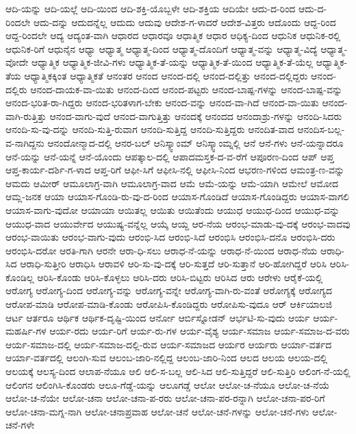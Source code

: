 {ಆದಿ-ಯನ್ನು
ಆದಿ-ಯಲ್ಲೆ
ಆದಿ-ಯಿಂದ
ಆದಿ-ಶಕ್ತಿ-ಯೊಬ್ಬಳೇ
ಆದಿ-ಶಕ್ತಿಯ
ಆದಿಯೇ
ಆದು-ದ-ರಿಂದ
ಆದು-ದ-ರಿಂದಲೇ
ಆದು-ದನ್ನು
ಆದುದನ್ನೆಲ್ಲ
ಆದುದು
ಆದುವು
ಆದೇಶ-ಗ-ಳಾದರೆ
ಆದೇಶ-ವಿತ್ತರು
ಆದೊಂದು
ಆದ್ದ-ರಿಂದ
ಆದ್ದ-ರಿಂದಲೇ
ಆದ್ಯ
ಆದ್ಯಂತ-ವಾಗಿ
ಆಧಾರದ
ಆಧಾರವೂ
ಆಧಾತ್ಮಿಕ
ಆಧಾರ
ಆಧಿಕ್ಯ-ದಿಂದ
ಆಧುನಿಕ
ಆಧುನಿಕ-ರಲ್ಲಿ
ಆಧುನಿಕ-ರಿಗೆ
ಆಧುನೈನ
ಆಧ್ಯಾ
ಆಧ್ಯಾತ್ಮ
ಆಧ್ಯಾತ್ಮ-ದಿಂದ
ಆಧ್ಯಾತ್ಮ-ದೊಂದಿಗೆ
ಆಧ್ಯಾತ್ಮ-ವನ್ನು
ಆಧ್ಯಾತ್ಮ-ವಿದ್ಯೆ
ಆಧ್ಯಾತ್ಮ-ವೋದೇ
ಆಧ್ಯಾತ್ಮಿಕ
ಆಧ್ಯಾತ್ಮಿಕ-ಜೀವಿ-ಗಳು
ಆಧ್ಯಾತ್ಮಿಕ-ತೆ-ಯನ್ನು
ಆಧ್ಯಾತ್ಮಿಕ-ತೆ-ಯಿಂದ
ಆಧ್ಯಾತ್ಮಿಕ-ತೆ-ಯೆಲ್ಲ
ಆಧ್ಯಾತ್ಮಿಕ-ತೆಯ
ಆಧ್ಯಾತ್ಮಿಕಕ್ಕಿಂತ
ಆಧ್ಯಾತ್ಮಿಕತೆ
ಆನಂತರ
ಆನಂದ
ಆನಂದ-ದಲ್ಲಿ
ಆನಂದ-ದಲ್ಲಿತ್ತು
ಆನಂದ-ದಲ್ಲಿದ್ದರು
ಆನಂದ-ದಲ್ಲಿರು
ಆನಂದ-ದಾಯಕ-ವಾ-ಯಿತು
ಆನಂದ-ದಿಂದ
ಆನಂದ-ಪಟ್ಟರು
ಆನಂದ-ಬಾಷ್ಪ-ಗಳನ್ನು
ಆನಂದ-ಬಾಷ್ಪ-ವನ್ನು
ಆನಂದ-ಭರಿತ-ರಾ-ಗಿದ್ದರು
ಆನಂದ-ಭರಿತಳಾಗ-ಬೇಕು
ಆನಂದ-ವನ್ನು
ಆನಂದ-ವಾ-ಗಿದೆ
ಆನಂದ-ವಾ-ಯಿತು
ಆನಂದ-ವಾಗಿ-ರುತ್ತಿತ್ತು
ಆನಂದ-ವಾಗು-ವುದೆ
ಆನಂದ-ವಾಗುತ್ತಿತ್ತು
ಆನಂದಕ್ಕೆ
ಆನಂದದ
ಆನಂದಾಶ್ರು-ಗಳನ್ನು
ಆನಂದಿ-ಸಿದರು
ಆನಂದಿ-ಸು-ವು-ದನ್ನು
ಆನಂದಿ-ಸುತ್ತಿ-ರುವಾಗ
ಆನಂದಿ-ಸುತ್ತಿದ್ದ
ಆನಂದಿ-ಸುತ್ತಿದ್ದರು
ಆನಂದಿತ-ವಾದ
ಆನಂದಿಸ-ಬಲ್ಲ-ವ-ನಾಗಿದ್ದನು
ಆನಂದೋನ್ಮಾದ-ದಲ್ಲಿ
ಆನರ-ಬಲ್
ಆನಿಸ್ಕ್ವಾಂಮ್
ಆನಿಸ್ಕ್ವಾಂಮ್ನಲ್ಲಿ
ಆನೆ
ಆನೆ-ಗಳು
ಆನೆ-ಯನ್ನಾದರೂ
ಆನೆ-ಯನ್ನು
ಆನೆ-ಯನ್ನೆ
ಆನೆ-ಯೊಂದು
ಆಪತ್ಕಾಲ-ದಲ್ಲಿ
ಆಪಾದಮಸ್ತಕ-ದ-ವ-ರೆಗೆ
ಆಪೂರಣ-ದಿಂದ
ಆಪ್
ಆಪ್ತ
ಆಪ್ತ-ಕಾರ್ಯ-ದರ್ಶಿ-ಗ-ಳಾದ
ಆಪ್ತ-ರಿಗೆ
ಆಫೀ-ಸಿಗೆ
ಆಫೀಸಿ-ನಲ್ಲಿ
ಆಫೀಸಿ-ನಿಂದ
ಆಭರಣ-ಗಳಿಂದ
ಆಮಂತ್ರ-ಣ-ವನ್ನು
ಆಮದು
ಆಮೀರ್
ಆಮೂಲಾಗ್ರ-ವಾಗಿ
ಆಮೂಲಾಗ್ರ-ವಾದ
ಆಮೆ
ಆಮೆ-ಯನ್ನು
ಆಮೆ-ಯಾಗಿ
ಆಮೇಲೆ
ಆಮೋದ
ಆಮ್ಲ-ಜನಕ
ಆಯಾ
ಆಯಾಸ-ಗೊಂಡಿ-ರು-ವು-ದ-ರಿಂದ
ಆಯಾಸ-ಗೊಂಡಿದೆ
ಆಯಾಸ-ಗೊಂಡಿದ್ದರು
ಆಯಾಸ-ವಾಗಲಿ
ಆಯಾಸ-ವಾಗು-ವುದೋ
ಆಯಾಯಾ
ಆಯಿತಲ್ಲ
ಆಯಿತು
ಆಯಿತೆಂದು
ಆಯುಧ
ಆಯುಧ-ದಿಂದ
ಆಯುಧ-ವನ್ನು
ಆಯುಧ-ವಾದ
ಆಯುರ್ವೇದ
ಆಯುಷ್ಯ-ವನ್ನೆಲ್ಲ
ಆಯ್ಕೆ
ಆಯ್ದ
ಆರ-ನೆಯ
ಆರಂಭ-ಮಾಡು-ವು-ದಕ್ಕೆ
ಆರಂಭ-ವಾದವು
ಆರಂಭ-ವಾಯಿತು
ಆರಂಭ-ವಾಗು-ವುದು
ಆರಂಭಿ-ಸಿದ
ಆರಂಭಿ-ಸಿದೆ
ಆರಂಭಿಸಿ
ಆರಂಭಿಸಿ-ದನೊ
ಆರಂಭಿಸಿ-ದರು
ಆರಂಭಿಸಿ-ದರೋ
ಆರತಿ-ಗಾಗಿ
ಆರನೇ
ಆರಾ-ಧಿ-ಸಲು
ಆರಾಧ-ನೆ-ಯನ್ನು
ಆರಾಧ-ನೆ-ಯಿಂದ
ಆರಾಧ-ನೆಯ
ಆರಾಧಿ-ಸಿದ
ಆರಾಧಿ-ಸುತ್ತೀರಿ
ಆರಾಧಿಸಿ
ಆರಾವಳಿ
ಆರಿ-ಸು-ವು-ದಕ್ಕೆ
ಆರಿ-ಸುತ್ತದೆ
ಆರಿ-ಸುತ್ತಾನೆ
ಆರಿ-ಹೋಗಿದ್ದರೆ
ಆರಿಸಿ
ಆರಿಸಿ-ಕೊಂಡಿಲ್ಲ
ಆರಿಸಿ-ಕೊಂಡು
ಆರಿಸಿ-ಕೊಳ್ಳಲು
ಆರಿಸಿ-ದರು
ಆರಿಸಿ-ಬಿಟ್ಟರು
ಆರಿಸಿದ
ಆರು
ಆರೇಳು
ಆರೈಕೆ-ಯಲ್ಲಿ
ಆರೋಗ್ಯ
ಆರೋಗ್ಯ-ದಿಂದ
ಆರೋಗ್ಯ-ವನ್ನು
ಆರೋಗ್ಯ-ವನ್ನೇ
ಆರೋಗ್ಯ-ವಾಗಿ-ರು-ವಂತೆ
ಆರೋಗ್ಯಕ್ಕೆ
ಆರೋಗ್ಯದ
ಆರೋಪ-ಮಾಡಿ
ಆರೋಪ-ಮಾಡಿ-ಕೊಂಡು
ಆರೋಪಿಸಿ-ಕೊಂಡಿದ್ದರು
ಆರೋಪಿಸು-ವುದೂ
ಆರ್
ಆರ್ಕಿಯಾಲಜಿ
ಆರ್ಟ
ಆರ್ತರೂ
ಆರ್ಥಿಕ
ಆರ್ಥಿಕ-ದೃಷ್ಟಿ-ಯಿಂದ
ಆರ್ನೋ
ಆರ್ಬಿಸ್ನೋಡನ್
ಆರ್ಭಟಿ-ಸು-ವುದು
ಆರ್ಯ
ಆರ್ಯ-ಮಹರ್ಷಿ-ಗಳ
ಆರ್ಯ-ರದು
ಆರ್ಯ-ರಿಗೆ
ಆರ್ಯ-ರು-ಗಳ
ಆರ್ಯ-ವೈಶ್ಯ
ಆರ್ಯ-ಸಮಾಜ
ಆರ್ಯ-ಸಮಾಜ-ದ-ವರು
ಆರ್ಯ-ಸಮಾಜ-ದಲ್ಲಿ
ಆರ್ಯ-ಸಮಾಜ-ದಲ್ಲಿ-ರುವ
ಆರ್ಯ-ಸಮಾಜದ
ಆರ್ಯರ
ಆರ್ಯರು
ಆರ್ಯಾ-ವರ್ತದ
ಆರ್ಯಾ-ವರ್ತದಲ್ಲಿ
ಆಲಂಗಿ-ಸುವ
ಆಲಂಬ-ಜಾರಿ-ನಲ್ಲಿದ್ದ
ಆಲಂಬ-ಜಾರಿ-ನಿಂದ
ಆಲದ
ಆಲಯ
ಆಲಯ-ದಲ್ಲಿ
ಆಲಯಕ್ಕೆ
ಆಲಸ್ಯ-ದಿಂದ
ಆಲಾಪ-ನೆಯೂ
ಆಲಿ
ಆಲಿ-ಸ-ಬಲ್ಲ
ಆಲಿ-ಸಿದ
ಆಲಿ-ಸುತ್ತಿದ್ದರೆ
ಆಲಿ-ಸುತ್ತಿರಿ
ಆಲಿಂಗ-ನೆ-ಯಲ್ಲಿ
ಆಲಿಂಗನ
ಆಲಿಂಗಿಸಿ-ಕೊಂಡರು
ಆಲೂ-ಗೆಡ್ಡೆ-ಯನ್ನು
ಆಲೂಗಡ್ಡೆ
ಆಲೋ
ಆಲೋ-ಚ-ನೆಯೂ
ಆಲೋ-ಚ-ನೆಯೆ
ಆಲೋ-ಚ-ನೆಯೇ
ಆಲೋ-ಚನಾ
ಆಲೋ-ಚನಾ-ಪ-ರರು
ಆಲೋ-ಚನಾ-ಪರ-ರನ್ನಾಗಿ
ಆಲೋ-ಚನಾ-ಪರ-ರಿಗೆ
ಆಲೋ-ಚನಾ-ಮಗ್ನ-ನಾಗಿ
ಆಲೋ-ಚನಾಪ್ರವಾಹ
ಆಲೋ-ಚನೆ
ಆಲೋ-ಚನೆ-ಗಳನ್ನು
ಆಲೋ-ಚನೆ-ಗಳು
ಆಲೋ-ಚನೆ-ಗಳೇ
}
